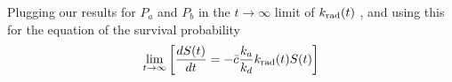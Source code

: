 \documentclass[a4paper,10pt]{article}
\begin{document}
Plugging our results for $P_a$ and $P_b$ in the $t\to\infty$ limit of $k_{\rm rad}(t)$ , and using this for the equation of the survival probability
\begin{equation}
 \lim_{t\to\infty} \left[ \frac{dS(t)}{dt} = -\bar{c} \frac{k_a}{k_d} k_{\rm rad}(t) S(t) \right]
 \elabel{SN}
\end{equation}
\end{document}
